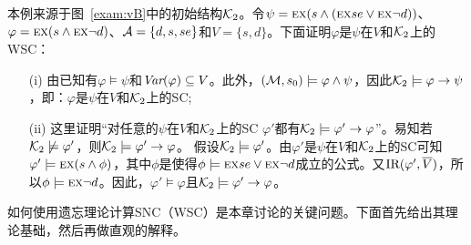 \begin{example}\label{examp:WSC}
	本例来源于图~\ref{exam:vB}中的初始结构${\cal K}_2$。令$\psi = \textsc{e} \textsc{x}(s \wedge (\textsc{e} \textsc{x} se \vee \textsc{e} \textsc{x} \neg d))$、$\varphi = \textsc{e} \textsc{x}(s \wedge \textsc{e} \textsc{x} \neg d)$、${\cal A} =\{d, s, se\}$和$V = \{s, d\}$。下面证明$\varphi$是$\psi$在$V$和${\cal K}_2$上的WSC：
	\begin{itemize}
		\item[(i)] 由已知有$\varphi \models \psi$和$\textit{Var}(\varphi) \subseteq V$。此外，$({\cal M}, s_0) \models \varphi \wedge \psi$，因此${\cal K}_2 \models \varphi \rightarrow \psi$，即：$\varphi$是$\psi$在$V$和${\cal K}_2$上的SC;
		\item[(ii)] 这里证明“对任意的$\psi$在$V$和${\cal K}_2$上的SC $\varphi'$都有${\cal K}_2 \models \varphi' \rightarrow \varphi$”。易知若${\cal K}_2 \not \models \varphi'$，则${\cal K}_2\models \varphi' \rightarrow \varphi$。
		假设${\cal K}_2 \models \varphi'$。由$\varphi'$是$\psi$在$V$和${\cal K}_2$上的SC可知$\varphi' \models \textsc{e} \textsc{x}(s \wedge \phi)$，其中$\phi$是使得$\phi\models \textsc{e} \textsc{x} se \vee \textsc{e} \textsc{x} \neg d$成立的公式。又$\textrm{IR}(\varphi', \overline V)$，所以$\phi \models \textsc{e} \textsc{x} \neg d$。因此，$\varphi' \models \varphi$且${\cal K}_2 \models \varphi' \rightarrow \varphi$。
	\end{itemize}
\end{example}


如何使用遗忘理论计算SNC（WSC）是本章讨论的关键问题。下面首先给出其理论基础，然后再做直观的解释。

